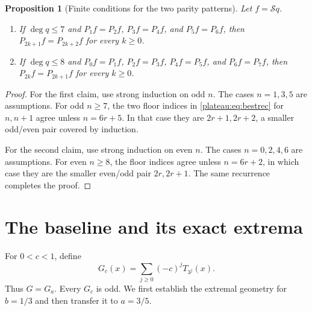 \documentclass[11pt]{article}
\newtheorem{proposition}[theorem]{Proposition}
\theoremstyle{remark}\newtheorem{remark}[theorem]{Remark}
\begin{document}
\begin{proposition}[Finite conditions for the two parity patterns]
\label{plateau:prop:finite}
Let $f=\mathcal S q$.
\begin{enumerate}
\item If $\deg q\le7$ and
$P_1f=P_2f$, $P_3f=P_4f$, and $P_5f=P_6f$, then
$P_{2k+1}f=P_{2k+2}f$ for every $k\ge0$.
\item If $\deg q\le8$ and
$P_0f=P_1f$, $P_2f=P_3f$, $P_4f=P_5f$, and $P_6f=P_7f$, then
$P_{2k}f=P_{2k+1}f$ for every $k\ge0$.
\end{enumerate}
\end{proposition}
\begin{proof}
For the first claim, use strong induction on odd $n$. The cases $n=1,3,5$
are assumptions. For odd $n\ge7$, the two floor indices in
\eqref{plateau:eq:bestrec} for $n,n+1$ agree unless $n=6r+5$. In that case they
are $2r+1,2r+2$, a smaller odd/even pair covered by induction.

For the second claim, use strong induction on even $n$. The cases
$n=0,2,4,6$ are assumptions. For even $n\ge8$, the floor indices agree
unless $n=6r+2$, in which case they are the smaller even/odd pair
$2r,2r+1$. The same recurrence completes the proof.
\end{proof}

\section{The baseline and its exact extrema}

For $0<c<1$, define
\[
 G_c(x)=\sum_{j\ge0}(-c)^j T_{3^j}(x).
\]
Thus $G=G_a$. Every $G_c$ is odd. We first establish the extremal geometry
for $b=1/3$ and then transfer it to $a=3/5$.
\end{document}
